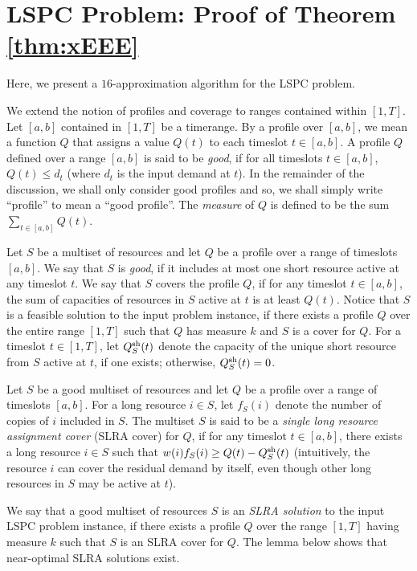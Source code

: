 \documentclass[11pt]{article}
\newcommand{\lspc}{{\sc LSPC}}
\newcommand{\sh} {{\rm sh}}
\begin{document}
\section{{\lspc} Problem: Proof of Theorem \ref{thm:xEEE}}
\label{sec:lspc}
Here, we present a $16$-approximation algorithm for the {\lspc} problem.

We extend the notion of profiles and coverage to ranges contained within $[1,T]$. 
Let $[a,b]$ contained in $[1,T]$ be a timerange. 
By a profile over $[a,b]$, we mean a function $Q$ that assigns a value $Q(t)$ to each timeslot $t\in [a,b]$. 
A profile $Q$ defined over a range $[a,b]$ is said to be {\em good}, if for all timeslots $t\in [a,b]$,
$Q(t)\leq d_t$ (where $d_t$ is the input demand at $t$).
In the remainder of the discussion, we shall only consider good profiles and so, we shall simply write
``profile'' to mean a ``good profile''.
The {\em measure} of $Q$ is defined to be the sum  $\sum_{t\in [a,b]} Q(t)$.

Let $S$ be a multiset of resources and let $Q$ be a profile over a range of timeslots $[a,b]$.
We say that $S$ is {\em good}, if it includes at most one short resource active at any timeslot $t$.
We say that $S$ covers the profile $Q$, 
if for any timeslot $t\in [a,b]$, the sum of capacities of resources
in $S$ active at $t$ is at least $Q(t)$. 
Notice that $S$ is a feasible solution to the input problem instance,
if there exists a profile $Q$ over the entire range $[1,T]$ such that 
$Q$ has measure $k$ and $S$ is a cover for $Q$.
For a timeslot $t\in [1,T]$, let $Q^{\sh}_S(t)$
denote the capacity of the unique short resource from $S$ active at $t$, if one exists; otherwise, 
$Q^{\sh}_S(t) = 0$.

Let $S$ be a good multiset of resources and let $Q$ be a profile over a range of timeslots $[a,b]$. 
For a long resource $i\in S$, let $f_S(i)$ denote the number of copies of $i$ included in $S$.
The multiset $S$ is said to be a {\em single long resource assignment cover} (SLRA cover) for $Q$,
if for any timeslot $t\in [a,b]$, there exists a long resource $i\in S$ such that
$w(i)f_S(i)\geq Q(t)-Q^{\sh}_S(t)$ (intuitively, the resource $i$ can cover the residual demand by itself,
even though other long resources in $S$ may be active at $t$).

We say that a good multiset of resources $S$ is an {\em SLRA solution} to the input {\lspc} problem instance,
if there exists a profile $Q$ over the range $[1,T]$ having measure $k$ such that $S$ is an SLRA cover for $Q$.
The lemma below shows that near-optimal SLRA solutions exist.
\end{document}
